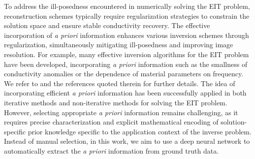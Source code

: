 \documentclass[11pt]{article}
\begin{document}
To address the ill-posedness encountered in numerically solving the EIT problem, reconstruction schemes typically require regularization strategies to constrain the solution space and ensure stable conductivity recovery.
The effective incorporation of \textit{a priori} information enhances various inversion schemes through regularization, simultaneously mitigating ill-posedness and improving image resolution. 
For example, many effective inversion algorithms for the EIT problem have been developed, incorporating \textit{a priori} information such as the smallness of conductivity anomalies or the dependence of material parameters on frequency.  
We refer to \cite{AHK04, AHK07, AHB14, AGS16} and the references quoted therein for further details.
The idea of incorporating efficient \textit{a priori} information has been successfully applied in both iterative methods \cite{DDC94, ANJ95, VMV98, BUE98, DHB99, KJP99, FTD10, FDG12} and non-iterative methods \cite{AMM16, AMH17, AMM18, SKM20, SKM21} for solving the EIT problem.
However, selecting appropriate \textit{a priori} information remains challenging, as it requires precise characterization and explicit mathematical encoding of solution-specific prior knowledge specific to the application context of the inverse problem.
Instead of manual selection, in this work, we aim to use a deep neural network to automatically extract the \textit{a priori} information from ground truth data.
\end{document}
